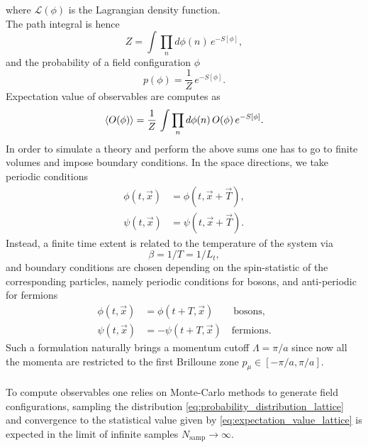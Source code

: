where $\mathcal{L}(\phi)$ is the Lagrangian density function.  \\
The path integral is hence
\begin{equation*}
    Z = \int \prod_n d\phi(n) \, e^{-S[\phi]},
\end{equation*}
and the probability of a field configuration $\phi$
\begin{equation}
    p(\phi) = \frac{1}{Z} \, e^{-S[\phi]}.
    \label{eq:probability_distribution_lattice}
\end{equation}
Expectation value of observables are computes as
\begin{equation}
    \left\langle O(\phi) \right\rangle  = \frac{1}{Z} \, \int \prod_n d\phi(n) \, O(\phi) \, e^{-S[\phi]}.
    \label{eq:expectation_value_lattice}
\end{equation}
In order to simulate a theory and perform the above sums one has to go to finite volumes and impose boundary conditions. In the space directions, we take periodic conditions 
\begin{equation*}
    \begin{aligned}
        \phi(t, \vec x) &= \phi(t, \vec x + \vec T), \\
        \psi(t, \vec x) &= \psi(t, \vec x + \vec T).
    \end{aligned}
\end{equation*}
Instead, a finite time extent is related to the temperature of the system \cite{le_bellac_1996,rothe_LGT} via
\begin{equation*}
    \beta = 1/T = 1/L_t,
\end{equation*}
and boundary conditions are chosen depending on the spin-statistic of the corresponding particles, namely periodic conditions for bosons, and anti-periodic for fermions
\begin{equation*}
    \begin{aligned}
        \phi(t, \vec x) &= \phi(t + T, \vec x) \qquad \text{bosons}, \\
        \psi(t, \vec x) &= -\psi(t + T, \vec x) \quad \text{fermions}.
    \end{aligned}
\end{equation*}
Such a formulation naturally brings a momentum cutoff $\Lambda = \pi/a$ since now all the momenta are restricted to the first Brilloune zone $p_\mu \in [-\pi/a, \pi/a]$. \\~\\
To compute observables one relies on Monte-Carlo methods to generate field configurations, sampling the distribution \eqref{eq:probability_distribution_lattice} and convergence to the statistical value given by \eqref{eq:expectation_value_lattice} is expected in the limit of infinite samples $N_\text{samp} \to \infty$. \\
